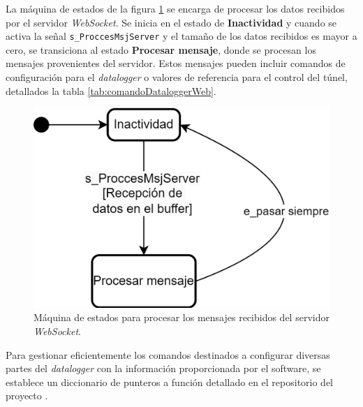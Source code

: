 

La máquina de estados de la figura \ref{fig:sc_processComand} se encarga de procesar los datos recibidos por el servidor \textit{WebSocket}. Se inicia en el estado de \textbf{Inactividad} y cuando se activa la señal \texttt{s\_ProccesMsjServer} y el tamaño de los datos recibidos es mayor a cero, se transiciona al estado \textbf{Procesar mensaje}, donde se procesan los mensajes provenientes del servidor. Estos mensajes pueden incluir comandos de configuración para el \textit{datalogger} o valores de referencia para el control del túnel, detallados la tabla \ref{tab:comandoDataloggerWeb}.

\begin{figure}[H]
    \centering
    \includegraphics[width=0.5\linewidth]{Figuras/datalogger/Firmware/sc_processComand.png}
    \caption{Máquina de estados para procesar los mensajes recibidos del servidor \textit{WebSocket}.}
    \label{fig:sc_processComand}
\end{figure}

Para gestionar eficientemente los comandos destinados a configurar diversas partes del \textit{datalogger} con la información proporcionada por el software, se establece un diccionario de punteros a función detallado en el repositorio del proyecto \cite{FirmwareSCA2024}.

